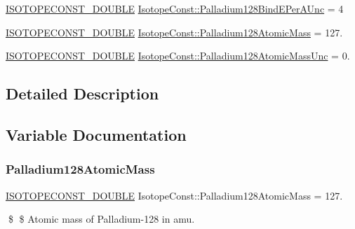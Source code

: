\begin{DoxyCompactItemize}
\mbox{\hyperlink{group___isotope_const-_macros_ga8f45a7272ce02c0b4c65c44636ed719a}{I\+S\+O\+T\+O\+P\+E\+C\+O\+N\+S\+T\+\_\+\+D\+O\+U\+B\+LE}} \mbox{\hyperlink{group___isotope_const-_palladium-_pd128_gae3d9a147fd1f8577a1347d1ae21dee7a}{Isotope\+Const\+::\+Palladium128\+Bind\+E\+Per\+A\+Unc}} = 4
\item 
\mbox{\hyperlink{group___isotope_const-_macros_ga8f45a7272ce02c0b4c65c44636ed719a}{I\+S\+O\+T\+O\+P\+E\+C\+O\+N\+S\+T\+\_\+\+D\+O\+U\+B\+LE}} \mbox{\hyperlink{group___isotope_const-_palladium-_pd128_gaf04c8418653f8cb95aaa792d0dd433c7}{Isotope\+Const\+::\+Palladium128\+Atomic\+Mass}} = 127.
\item 
\mbox{\hyperlink{group___isotope_const-_macros_ga8f45a7272ce02c0b4c65c44636ed719a}{I\+S\+O\+T\+O\+P\+E\+C\+O\+N\+S\+T\+\_\+\+D\+O\+U\+B\+LE}} \mbox{\hyperlink{group___isotope_const-_palladium-_pd128_ga474b35c5ed821e7758c65d670e146b72}{Isotope\+Const\+::\+Palladium128\+Atomic\+Mass\+Unc}} = 0.
\end{DoxyCompactItemize}


\subsection{Detailed Description}


\subsection{Variable Documentation}
\mbox{\label{group___isotope_const-_palladium-_pd128_gaf04c8418653f8cb95aaa792d0dd433c7}} 
\subsubsection{\texorpdfstring{Palladium128\+Atomic\+Mass}{Palladium128AtomicMass}}
{\footnotesize\ttfamily \mbox{\hyperlink{group___isotope_const-_macros_ga8f45a7272ce02c0b4c65c44636ed719a}{I\+S\+O\+T\+O\+P\+E\+C\+O\+N\+S\+T\+\_\+\+D\+O\+U\+B\+LE}} Isotope\+Const\+::\+Palladium128\+Atomic\+Mass = 127.}

\$ \$ Atomic mass of Palladium-\/128 in amu. \mbox{\label{group___isotope_const-_palladium-_pd128_ga474b35c5ed821e7758c65d670e146b72}} 
